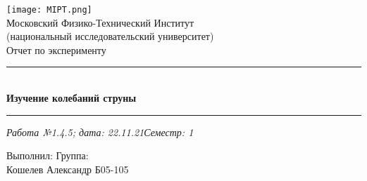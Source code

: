 \documentclass[12pt,a4paper]{scrartcl}
\begin{document}
	\graphicspath{{C:/Users/Alex/OneDrive/Изображения/TexImgs}}
	
	\newcommand{\ms}{\mathstrut}
	\newcommand{\msp}{\hspace{0.5cm}}
	\newcommand{\al}{\alpha}
	\newcommand{\dg}{^\circ}
	\newcommand{\qd}[2]{^{\frac{#1}{#2}}}
	\newcommand{\qdm}[2]{^{-\frac{#1}{#2}}}
	\newcommand{\lm}[2]{\underset{#1 \rightarrow #2}{\lim}}
	\newcommand{\sfrac}[2]{\dfrac{\strut #1}{\strut #2}}
	\newcommand{\equal}[1]{\overset{(#1)}{=}}
	\newcommand{\linevdots}{\ \raisebox{-.08\height}{\vdots}\ }
	\newcommand{\linecvdots}{\ \raisebox{-.08\height}{\vdots}\hspace{-0.13cm}\raisebox{.15\height}{\cancel{\phantom{a}}\hspace{0.06cm}}}
	\newcommand{\combox}[1]{\ms \msp \msp \begin{minipage}{0.95\linewidth}
			#1
	\end{minipage}}
	
	\newtheorem{pr}{Задача}
	\newtheorem{ex}{Пример}
	\newtheorem{dfn}{Def}
	\newtheorem{theorem}{Th}
	
	\newenvironment{slv}{\ms \msp \textit{Решение:}}{}
	\newenvironment{proof}{\ms \msp \textit{Доказательство: }}{\hfill $\square$}
	
	\begin{titlepage}
		
		\vspace*{\fill}
		
		\begin{center}
			\texttt{[image: MIPT.png]}
			\\[0.7cm]\Huge Московский Физико-Технический Институт\\(национальный исследовательский университет)
			\\[2cm]\LARGE Отчет по эксперименту
			\\[0.5cm]\noindent\rule{\textwidth}{1pt}
			\\\Huge\textbf{Изучение колебаний струны}
			\\[-0.5cm]\noindent\rule{\textwidth}{1pt}
		\end{center}
		
		\begin{flushleft}
			\textit{Работа №1.4.5; дата: 22.11.21}\hfill\textit{Семестр: 1}
		\end{flushleft}
		
		\vspace*{\fill}
		
		\begin{flushleft}
			Выполнил: \hspace{\fill} Группа:
			\\Кошелев Александр \hspace{\fill} Б05-105
		\end{flushleft}
	\end{titlepage}
	
\end{document}
